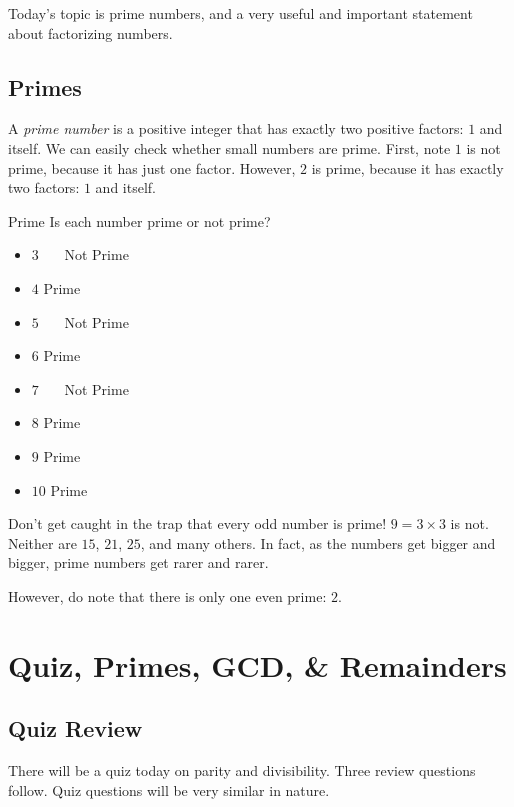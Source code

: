 \documentclass[a4paper,10pt]{report}
\begin{document}
Today's topic is prime numbers, and a very useful and important statement about
factorizing numbers.

\section{Primes}
A \emph{prime number} is a positive integer that has exactly two positive
factors: $1$ and itself. We can easily check whether small numbers are prime.
First, note $1$ is not prime, because it has just one factor. However, $2$ is
prime, because it has exactly two factors: $1$ and itself.

\begin{problem}{Prime}
 Is each number prime or not prime?

 \begin{itemize}
  \item $3$ \hfill {}~~~Not Prime
  \item $4$ \hfill Prime~~~
  \item $5$ \hfill {}~~~Not Prime
  \item $6$ \hfill Prime~~~
  \item $7$ \hfill {}~~~Not Prime
  \item $8$ \hfill Prime~~~
  \item $9$ \hfill Prime~~~
  \item $10$ \hfill Prime~~~
 \end{itemize}
\end{problem}

Don't get caught in the trap that every odd number is prime! $9=3\times3$ is
not. Neither are $15$, $21$, $25$, and many others. In fact, as the numbers get
bigger and bigger, prime numbers get rarer and rarer.

However, do note that there is only one even prime: $2$.

\chapter{Quiz, Primes, GCD, \& Remainders}

\section{Quiz Review}

There will be a quiz today on parity and divisibility. Three review questions
follow. Quiz questions will be very similar in nature.
\end{document}
